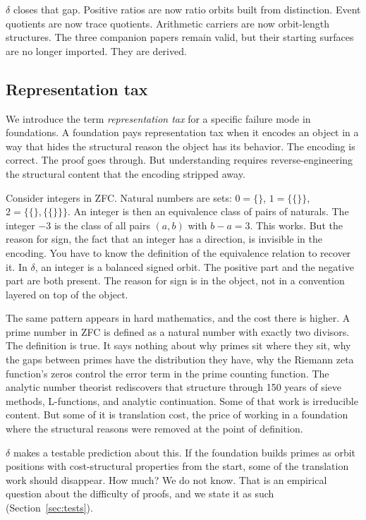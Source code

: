 \documentclass[11pt,a4paper]{article}
\theoremstyle{definition}
\theoremstyle{remark}
\begin{document}
$\delta$ closes that gap. Positive ratios are now ratio orbits built from
distinction. Event quotients are now trace quotients. Arithmetic carriers are
now orbit-length structures. The three companion papers remain valid, but their
starting surfaces are no longer imported. They are derived.

\subsection{Representation tax}

We introduce the term \emph{representation tax} for a specific failure mode in
foundations. A foundation pays representation tax when it encodes an object in
a way that hides the structural reason the object has its behavior. The
encoding is correct. The proof goes through. But understanding requires
reverse-engineering the structural content that the encoding stripped away.

Consider integers in ZFC. Natural numbers are sets: $0 = \{\}$,
$1 = \{\{\}\}$, $2 = \{\{\}, \{\{\}\}\}$. An integer is then an equivalence
class of pairs of naturals. The integer $-3$ is the class of all pairs $(a,b)$
with $b - a = 3$. This works. But the reason for sign, the fact that an
integer has a direction, is invisible in the encoding. You have to know the
definition of the equivalence relation to recover it. In $\delta$, an integer
is a balanced signed orbit. The positive part and the negative part are both
present. The reason for sign is in the object, not in a convention layered on
top of the object.

The same pattern appears in hard mathematics, and the cost there is higher.
A prime number in ZFC is defined as a natural number with exactly two
divisors. The definition is true. It says nothing about why primes sit where
they sit, why the gaps between primes have the distribution they have, why the
Riemann zeta function's zeros control the error term in the prime counting
function. The analytic number theorist rediscovers that structure through
150 years of sieve methods, L-functions, and analytic continuation. Some of
that work is irreducible content. But some of it is translation cost, the
price of working in a foundation where the structural reasons were removed at
the point of definition.

$\delta$ makes a testable prediction about this. If the foundation builds
primes as orbit positions with cost-structural properties from the start, some
of the translation work should disappear. How much? We do not know. That is an
empirical question about the difficulty of proofs, and we state it as such
(Section~\ref{sec:tests}).
\end{document}
